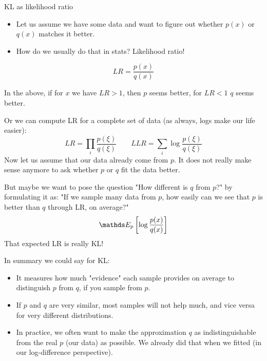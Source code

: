 \documentclass[11pt,compress,t,notes=noshow, xcolor=table]{beamer}
\begin{document}
\begin{vbframe}{KL as likelihood ratio}

\begin{itemize}
\item Let us assume we have some data and want to figure out whether $p(x)$ or $q(x)$ matches it better.
\item How do we usually do that in stats? Likelihood ratio! 
\end{itemize}

$$ LR = \frac{p(x)}{q(x)} $$
  
In the above, if for $x$ we have $LR>1$, then $p$ seems better, for $LR < 1$ $q$ seems better.

\framebreak

Or we can compute LR for a complete set of data (as always, logs make our life easier):
$$ LR = \prod_i \frac{p(\xi)}{q(\xi)} \qquad LLR = \sum_i \log \frac{p(\xi)}{q(\xi)} $$
Now let us assume that our data already come from $p$. It does not really make sense anymore to ask 
whether $p$ or $q$ fit the data better.

But maybe we want to pose the question "How different is $q$ from $p$?" by formulating it as:
"If we sample many data from $p$, how easily can we see that $p$ is better than $q$ through LR, on average?"
$$ \E_p \left[\log \frac{p(x)}{q(x)}\right] $$
That expected LR is really KL!

\framebreak 

In summary we could say for KL:
\begin{itemize}
\item It measures how much "evidence" each sample provides on average to distinguish $p$ from $q$, 
  if you sample from $p$.
\item If $p$ and $q$ are very similar, most samples will not help much, and vice versa for very different distributions.
\item In practice, we often want to make the approximation $q$ as indistinguishable from the real $p$ (our data) as possible. We already did that when we fitted (in our log-difference perspective).
\end{itemize}

\end{vbframe}


  
\end{document}
